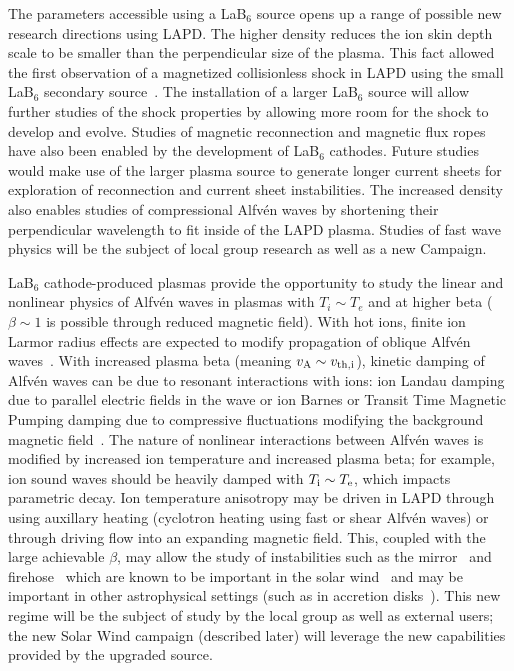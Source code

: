 \documentclass[11pt]{article}
\renewcommand{\cite}{\citep}
\begin{document}
The parameters accessible using a LaB$_6$ source opens up a range of
possible new research directions using LAPD.  The higher density
reduces the ion skin depth scale to be smaller than the perpendicular
size of the plasma.  This fact allowed the first observation of a
magnetized collisionless shock in LAPD using the small LaB$_6$
secondary source~\cite{schaeffer:2014,niemann:2014}.  The installation of a larger LaB$_6$ source
will allow further studies of the shock properties by allowing more room
for the shock to develop and evolve.  Studies of magnetic
reconnection and magnetic flux ropes have also been enabled by the
development of LaB$_6$ cathodes.  Future studies would make use of the larger
plasma source to generate longer current sheets for exploration of
reconnection and current sheet instabilities.  The increased
density also enables studies of compressional Alfv\'{e}n waves by
shortening their perpendicular wavelength to fit inside of the LAPD plasma.
Studies of fast wave physics will be the subject of local group
research as well as a new Campaign.  

LaB$_6$ cathode-produced plasmas provide the opportunity to study the
linear and nonlinear physics of Alfv\'{e}n waves in plasmas with $T_i
\sim T_e$ and at higher beta ($\beta \sim 1$ is possible through
reduced magnetic field).  With hot ions, finite ion Larmor radius
effects are expected to modify propagation of oblique Alfv\'{e}n
waves~\cite{hasegawa76,lysak96}.  With increased plasma beta (meaning
$v_{\rm A} \sim v_{\rm th,i}$), kinetic damping of Alfv\'{e}n waves
can be due to resonant interactions with ions: ion Landau damping due
to parallel electric fields in the wave or ion Barnes or Transit Time
Magnetic Pumping damping due to compressive fluctuations modifying the
background magnetic field~\cite{barnes66}.  The nature of nonlinear
interactions between Alfv\'{e}n waves is modified by increased ion
temperature and increased plasma beta; for example, ion sound waves
should be heavily damped with $T_{\rm i} \sim T_{\rm e}$, which
impacts parametric decay.  Ion temperature anisotropy may be driven
in LAPD through using auxillary heating (cyclotron heating using fast
or shear Alfv\'{e}n waves) or through driving flow into an expanding
magnetic field.  This, coupled with the
large achievable $\beta$, may allow the study of 
instabilities such as the mirror~\cite{gary92} and firehose~\cite{gary98} which are known to be
important in the solar wind~\cite{hellinger06,bale09} and may be important in other
astrophysical settings (such as in accretion disks~\cite{schekochihin08}).   This
new regime will be the subject of study by the local group as well as
external users; the new Solar Wind campaign (described later) will
leverage the new capabilities provided by the upgraded source.
\end{document}
